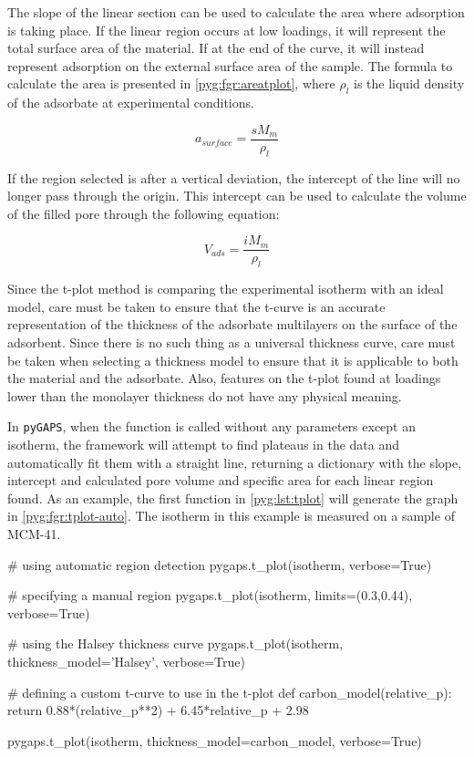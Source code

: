 The slope of the linear section can be used to calculate the area where
adsorption is taking place. If the linear region occurs at low loadings,
it will represent the total surface area of the material.
If at the end of the curve, it will instead represent adsorption on
the external surface area of the sample. The formula to calculate the area
is presented in \autoref{pyg:fgr:areatplot},
where \(\rho_{l}\) is the liquid density of the adsorbate at experimental
conditions.

\begin{equation}\label{pyg:fgr:areatplot}
	a_{surface} = \frac{s M_m}{\rho_{l}}
\end{equation}

If the region selected is after a vertical deviation, the intercept of 
the line will no longer pass through the origin. This intercept can 
be used to calculate the volume of the filled pore through the 
following equation:

\begin{equation}
	V_{ads} = \frac{i M_m}{\rho_{l}}
\end{equation}

Since the t-plot method is comparing the experimental isotherm 
with an ideal model, care must be taken to ensure that the t-curve
is an accurate representation of the thickness of the 
adsorbate multilayers on the surface of the adsorbent. 
Since there is no such thing as a universal thickness curve,
care must be taken when selecting a thickness model to ensure that it
is applicable to both the material and the adsorbate.
Also, features on the t-plot found at loadings lower than the monolayer
thickness do not have any physical meaning.

In \texttt{pyGAPS}, when the function is called without any parameters
except an isotherm, the framework will attempt to find 
plateaus in the data and
automatically fit them with a straight line, returning a dictionary
with the slope, intercept and calculated pore volume and specific area
for each linear region found. As an example, the first function in
\autoref{pyg:lst:tplot} will generate the graph in
\autoref{pyg:fgr:tplot-auto}. The isotherm in this example is measured
on a sample of MCM-41.

\begin{python}[float=htb, caption={Generating a t-plot},%
    label={pyg:lst:tplot}]
# using automatic region detection
pygaps.t_plot(isotherm, verbose=True)

# specifying a manual region
pygaps.t_plot(isotherm, limits=(0.3,0.44), verbose=True)

# using the Halsey thickness curve
pygaps.t_plot(isotherm, thickness_model='Halsey', verbose=True)

# defining a custom t-curve to use in the t-plot
def carbon_model(relative_p):
	return 0.88*(relative_p**2) + 6.45*relative_p + 2.98

pygaps.t_plot(isotherm, thickness_model=carbon_model, verbose=True)
\end{python}

